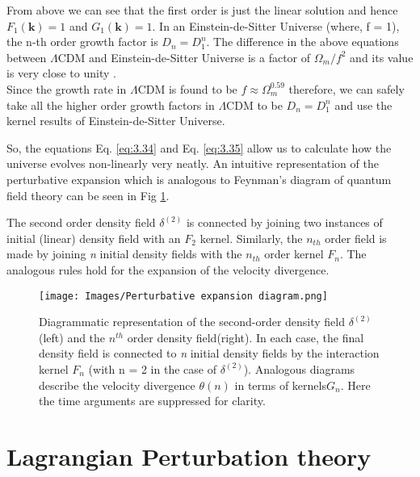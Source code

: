 From above we can see that the first order is just the linear solution and hence $F_{1}(\mathbf{k})=1$ and $G_{1}(\mathbf{k})=1$. In an Einstein-de-Sitter Universe
(where, f = 1), the n-th order growth factor is $D_{n} = D^{n}_{1}$. The difference in the above equations between $\Lambda$CDM and Einstein-de-Sitter Universe is a factor of $\Omega_{m}/f^{2}$ and its value is very close to unity \cite{Bernardeau_2002}.\\
Since the growth rate in $\Lambda$CDM is found to be $f \approx \Omega _{m}^{0.59}$ therefore, we can safely take all the higher order growth factors in $\Lambda$CDM to be $D_{n} = D^{n}_{1}$ and use the kernel results of Einstein-de-Sitter Universe.

So, the equations Eq. \eqref{eq:3.34} and Eq. \eqref{eq:3.35} allow us to calculate how the universe evolves non-linearly very neatly. An intuitive representation of the perturbative expansion which is analogous to Feynman's diagram of quantum field theory can be seen in Fig \ref{fig:2.1}.


The second order density field $\delta^{(2)}$ is connected by joining two instances of initial (linear) density field with an $F_{2}$ kernel. Similarly, the $n_{th}$ order field is made by joining \emph{n} initial density fields with the $n_{th}$ order kernel $F_{n}$. The
analogous rules hold for the expansion of the velocity divergence.

\begin{figure}[ht]
    \centering
    \texttt{[image: Images/Perturbative expansion diagram.png]}
    \caption{Diagrammatic representation of the second-order density field $\delta^{(2)}$ (left) and the $n^{th}$ order density field(right). In each case, the final density field is connected to \emph{n} initial density fields by the interaction kernel $F_{n}$ (with n = 2 in the case of $\delta^{(2)}$). Analogous diagrams describe the velocity divergence $\theta(n)$ in terms of kernels$G_{n}$. Here the time arguments are suppressed for clarity.\cite{Dodelson}}
    \label{fig:2.1} 
\end{figure}\newpage


\section{Lagrangian Perturbation theory}
